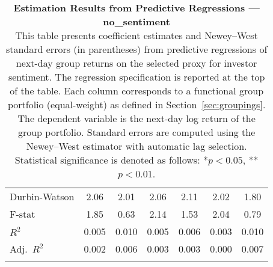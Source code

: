 \begin{table}[ht]
\begin{tabular}{l *{6}{c}}
Durbin-Watson & 2.06 & 2.01 & 2.06 & 2.11 & 2.02 & 1.80 \\
F-stat & 1.85 & 0.63 & 2.14 & 1.53 & 2.04 & 0.79 \\
\(R^2\) & 0.005 & 0.010 & 0.005 & 0.006 & 0.003 & 0.010 \\
Adj.\ \(R^2\) & 0.002 & 0.006 & 0.003 & 0.003 & 0.000 & 0.007 \\
\addlinespace
\midrule
\multicolumn{7}{c}{Specification tested: $R_{g,t+1} = \alpha_g + \beta_{sent,g} S_t + \phi R_{g,t} + \theta B_{g,t} + \gamma M_t + \varepsilon_{g,t+1}$}\\
\bottomrule
\end{tabular}
\caption{\textbf{Estimation Results from Predictive Regressions — no_sentiment} \\
This table presents coefficient estimates and Newey--West standard errors (in parentheses) from predictive regressions of next-day group returns on the selected proxy for investor sentiment.
The regression specification is reported at the top of the table. Each column corresponds to a functional group portfolio (equal-weight) as defined in Section~\ref{sec:groupings}.
The dependent variable is the next-day log return of the group portfolio. Standard errors are computed using the Newey--West estimator with automatic lag selection. Statistical significance is denoted as follows: *$p<0.05$, **$p<0.01$.}
\label{tab:h2_no_sentiment_results}
\end{table}